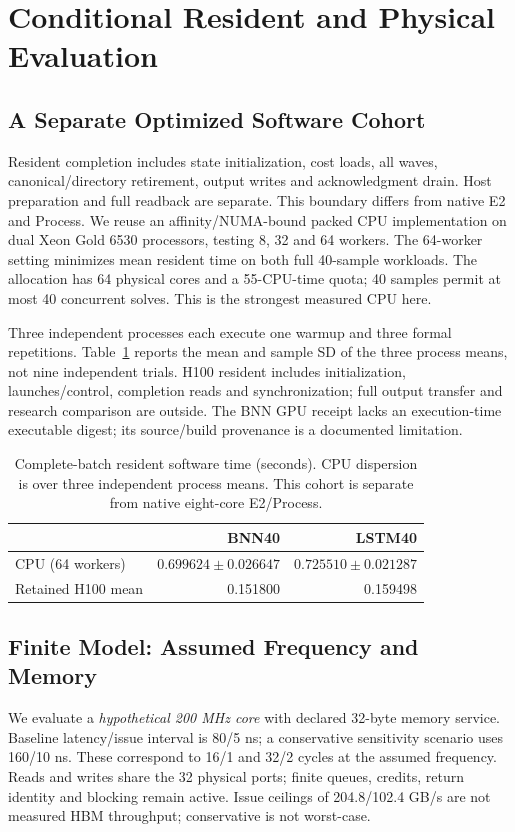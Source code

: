 \section{Conditional Resident and Physical Evaluation}
\subsection{A Separate Optimized Software Cohort}
Resident completion includes state initialization, cost loads, all waves, canonical/directory retirement, output writes and acknowledgment drain. Host preparation and full readback are separate. This boundary differs from native E2 and Process. We reuse an affinity/NUMA-bound packed CPU implementation on dual Xeon Gold 6530 processors, testing 8, 32 and 64 workers. The 64-worker setting minimizes mean resident time on both full 40-sample workloads. The allocation has 64 physical cores and a 55-CPU-time quota; 40 samples permit at most 40 concurrent solves. This is the strongest measured CPU here.

Three independent processes each execute one warmup and three formal repetitions. Table~\ref{tab:resident} reports the mean and sample SD of the three process means, not nine independent trials. H100 resident includes initialization, launches/control, completion reads and synchronization; full output transfer and research comparison are outside. The BNN GPU receipt lacks an execution-time executable digest; its source/build provenance is a documented limitation.

\begin{table}[t]\centering
\caption{Complete-batch resident software time (seconds). CPU dispersion is over three independent process means. This cohort is separate from native eight-core E2/Process.}\label{tab:resident}
\setlength{\tabcolsep}{4pt}
\begin{tabular}{lrr}\toprule & BNN40 & LSTM40\\\midrule
CPU (64 workers) & $0.699624\pm0.026647$ & $0.725510\pm0.021287$\\
Retained H100 mean & 0.151800 & 0.159498\\
\bottomrule\end{tabular}
\end{table}

\subsection{Finite Model: Assumed Frequency and Memory}
We evaluate a \emph{hypothetical 200 MHz core} with declared 32-byte memory service. Baseline latency/issue interval is 80/5 ns; a conservative sensitivity scenario uses 160/10 ns. These correspond to 16/1 and 32/2 cycles at the assumed frequency. Reads and writes share the 32 physical ports; finite queues, credits, return identity and blocking remain active. Issue ceilings of 204.8/102.4 GB/s are not measured HBM throughput; conservative is not worst-case.

